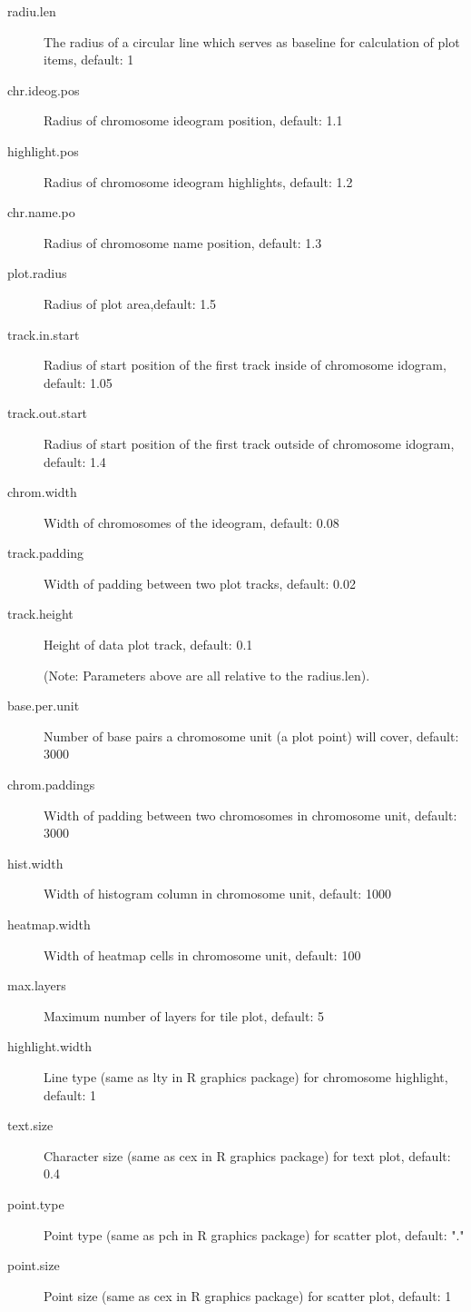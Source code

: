 \documentclass{article}
\begin{document}
\begin{description}
\item[radiu.len] 
The radius of a circular line which serves as baseline for
calculation of plot items, default: 1
\item[chr.ideog.pos]
Radius of chromosome ideogram position, default: 1.1
\item[highlight.pos]
Radius of chromosome ideogram highlights, default: 1.2
\item[chr.name.po]
Radius of chromosome name position, default: 1.3
\item[plot.radius]
Radius of plot area,default: 1.5
\item[track.in.start]
Radius of start position of the first track inside of chromosome idogram, default: 1.05
\item[track.out.start]
Radius of start position of the first track outside of chromosome idogram, default: 1.4

\medskip  

\item[chrom.width]
Width of chromosomes of the ideogram, default: 0.08
\item[track.padding]
Width of padding between two plot tracks, default: 0.02
\item[track.height]
Height of data plot track, default: 0.1
\item[  ]
(Note: Parameters above are all relative to the radius.len).

\smallskip  
    
\item[base.per.unit]
Number of base pairs a chromosome unit (a plot point) will cover, default: 3000
\item[chrom.paddings]
Width of padding between two chromosomes in chromosome unit, default: 3000

\medskip  
  
\item[hist.width]
Width of histogram column in chromosome unit, default: 1000
\item[heatmap.width]
Width of heatmap cells in chromosome unit, default: 100
\item[max.layers]
Maximum number of layers for tile plot, default: 5

\smallskip  
  
\item[highlight.width]
Line type (same as lty in R graphics package) for chromosome highlight, default: 1
\item[text.size]
Character size (same as cex in R graphics package) for text plot, default: 0.4
\item[point.type]
Point type (same as pch in R graphics package) for scatter plot, default: "."
\item[point.size]
Point size (same as cex in R graphics package) for scatter plot, default: 1
\end{description}
\end{document}
